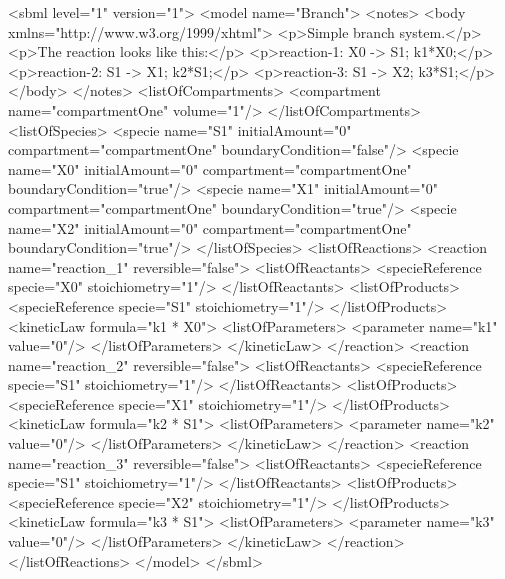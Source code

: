 \documentclass[10pt]{cekarticle}
\begin{document}
\begin{example}
<sbml level="1" version="1">
    <model name="Branch">
        <notes>
            <body xmlns="http://www.w3.org/1999/xhtml">
                <p>Simple branch system.</p>
                <p>The reaction looks like this:</p>
                <p>reaction-1:   X0 -> S1; k1*X0;</p>
                <p>reaction-2:   S1 -> X1; k2*S1;</p>
                <p>reaction-3:   S1 -> X2; k3*S1;</p>
            </body>
        </notes>
        <listOfCompartments>
            <compartment name="compartmentOne" volume="1"/>
        </listOfCompartments>
        <listOfSpecies>
            <specie name="S1" initialAmount="0" compartment="compartmentOne"
                    boundaryCondition="false"/>
            <specie name="X0" initialAmount="0" compartment="compartmentOne"
                    boundaryCondition="true"/>
            <specie name="X1" initialAmount="0" compartment="compartmentOne"
                    boundaryCondition="true"/>
            <specie name="X2" initialAmount="0" compartment="compartmentOne"
                    boundaryCondition="true"/>
        </listOfSpecies>
        <listOfReactions>
            <reaction name="reaction_1" reversible="false">
                <listOfReactants>
                    <specieReference specie="X0" stoichiometry="1"/>
                </listOfReactants>
                <listOfProducts>
                    <specieReference specie="S1" stoichiometry="1"/>
                </listOfProducts>
                <kineticLaw formula="k1 * X0">
                    <listOfParameters>
                        <parameter name="k1" value="0"/>
                    </listOfParameters>
                </kineticLaw>
            </reaction>
            <reaction name="reaction_2" reversible="false">
                <listOfReactants>
                    <specieReference specie="S1" stoichiometry="1"/>
                </listOfReactants>
                <listOfProducts>
                    <specieReference specie="X1" stoichiometry="1"/>
                </listOfProducts>
                <kineticLaw formula="k2 * S1">
                    <listOfParameters>
                        <parameter name="k2" value="0"/>
                    </listOfParameters>
                </kineticLaw>
            </reaction>
            <reaction name="reaction_3" reversible="false">
                <listOfReactants>
                    <specieReference specie="S1" stoichiometry="1"/>
                </listOfReactants>
                <listOfProducts>
                    <specieReference specie="X2" stoichiometry="1"/>
                </listOfProducts>
                <kineticLaw formula="k3 * S1">
                    <listOfParameters>
                        <parameter name="k3" value="0"/>
                    </listOfParameters>
                </kineticLaw>
            </reaction>
        </listOfReactions>
    </model>
</sbml>
\end{example}
\end{document}
